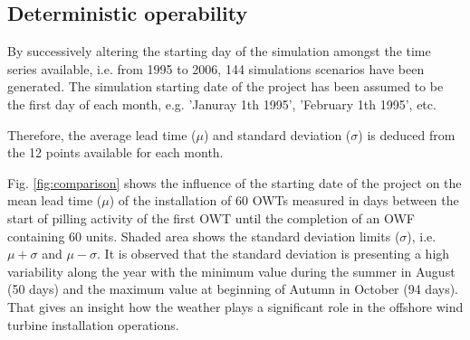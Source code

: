 \subsection{Deterministic operability}
By successively altering the starting day of the simulation amongst the time series available, i.e. from 1995 to 2006, 144 simulations scenarios have been generated. The simulation starting date of the project has been assumed to be the first day of each month, e.g. 'Januray 1th 1995', 'February 1th 1995', etc. 



Therefore, the average lead time ($\mu$) and standard deviation ($\sigma$) is deduced from the 12 points available for each month.

Fig. \ref{fig:comparison} shows the influence of the starting date of the project on the mean lead time ($\mu$) of the installation of 60 OWTs measured in days between the start of pilling activity of the first OWT until the completion of an OWF containing 60 units. Shaded area shows the standard deviation limits ($\sigma$), i.e. $\mu + \sigma$ and $\mu - \sigma$. It is observed that the standard deviation is presenting a high variability along the year with the minimum value during the summer in August (50 days) and the maximum value at beginning of Autumn in October (94 days). That gives an insight how the weather plays a significant role in the offshore wind turbine installation operations.